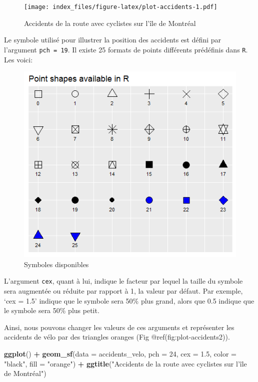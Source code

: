 \documentclass[]{article}
\newenvironment{Shaded}{\begin{snugshade}}{\end{snugshade}}
\newcommand{\KeywordTok}[1]{\textcolor[rgb]{0.13,0.29,0.53}{\textbf{#1}}}
\newcommand{\DataTypeTok}[1]{\textcolor[rgb]{0.13,0.29,0.53}{#1}}
\newcommand{\DecValTok}[1]{\textcolor[rgb]{0.00,0.00,0.81}{#1}}
\newcommand{\FloatTok}[1]{\textcolor[rgb]{0.00,0.00,0.81}{#1}}
\newcommand{\StringTok}[1]{\textcolor[rgb]{0.31,0.60,0.02}{#1}}
\newcommand{\OperatorTok}[1]{\textcolor[rgb]{0.81,0.36,0.00}{\textbf{#1}}}
\newcommand{\NormalTok}[1]{#1}
\begin{document}
\begin{figure}
\centering
\texttt{[image: index\_files/figure-latex/plot-accidents-1.pdf]}
\caption{Accidents de la route avec cyclistes sur l'île de Montréal}
\end{figure}

Le symbole utilisé pour illustrer la position des accidents est défini
par l'argument \texttt{pch\ =\ 19}. Il existe 25 formats de points
différents prédéfinis dans \texttt{R}. Les voici:

\begin{figure}
\includegraphics[width=0.5\linewidth]{Module3/3_symbolesR} \caption{Symboles disponibles}\label{fig:plot-symbols}
\end{figure}

L'argument \texttt{cex}, quant à lui, indique le facteur par lequel la
taille du symbole sera augmentée ou réduite par rapport à 1, la valeur
par défaut. Par exemple, `cex = 1.5' indique que le symbole sera 50\%
plus grand, alors que 0.5 indique que le symbole sera 50\% plus petit.

Ainsi, nous pouvons changer les valeurs de ces arguments et représenter
les accidents de vélo par des triangles oranges (Fig
@ref(fig:plot-accidents2)).

\begin{Shaded}
\begin{Highlighting}[]
\KeywordTok{ggplot}\NormalTok{() }\OperatorTok{+}
\KeywordTok{geom_sf}\NormalTok{(}\DataTypeTok{data =}\NormalTok{ accidents_velo, }\DataTypeTok{pch =} \DecValTok{24}\NormalTok{, }\DataTypeTok{cex =} \FloatTok{1.5}\NormalTok{, }\DataTypeTok{color =} \StringTok{"black"}\NormalTok{, }\DataTypeTok{fill =} \StringTok{"orange"}\NormalTok{) }\OperatorTok{+}
\KeywordTok{ggtitle}\NormalTok{(}\StringTok{"Accidents de la route avec cyclistes sur l'île de Montréal"}\NormalTok{)}
\end{Highlighting}
\end{Shaded}
\end{document}
